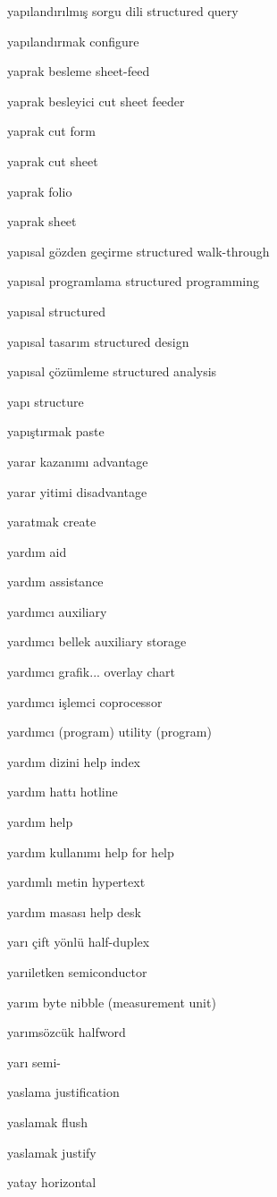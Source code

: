\documentclass[12pt,fleqn]{article}\usepackage{../../common}
\begin{document}
yapılandırılmış sorgu dili structured query

yapılandırmak configure

yaprak besleme sheet-feed

yaprak besleyici cut sheet feeder

yaprak cut form

yaprak cut sheet

yaprak folio

yaprak sheet

yapısal gözden geçirme structured walk-through

yapısal programlama structured programming

yapısal structured

yapısal tasarım structured design

yapısal çözümleme structured analysis

yapı structure

yapıştırmak paste

yarar kazanımı advantage

yarar yitimi disadvantage

yaratmak create

yardım aid

yardım assistance

yardımcı auxiliary

yardımcı bellek auxiliary storage

yardımcı grafik... overlay chart

yardımcı işlemci coprocessor

yardımcı (program) utility (program)

yardım dizini help index

yardım hattı hotline

yardım help

yardım kullanımı help for help

yardımlı metin hypertext

yardım masası help desk

yarı çift yönlü half-duplex

yarıiletken semiconductor

yarım byte nibble (measurement unit)

yarımsözcük halfword

yarı semi-

yaslama justification

yaslamak flush

yaslamak justify

yatay horizontal
\end{document}
